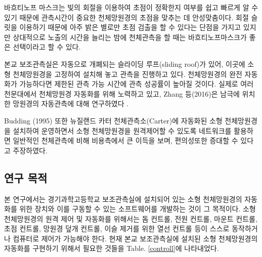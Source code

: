 바흐티노프 마스크는 빛의 회절을 이용하여 초점이 정확한지 여부를  쉽고 빠르게 알 수 있기 때문에 관측시간이 중요한 천체망원경의 초점을 맞추는 데 안성맞춤이다. 회절 슬릿을 이용하기 때문에 아주 밝은 별로만 초점 검출을 할 수 있다는 단점을 가지고 있지만 상대적으로 노출의 시간을 늘리는 밤에 천체관측을 할 때는 바흐티노프마스크가 좋은 선택이라고 할 수 있다.

본교 보조관측실은 자동으로 개폐되는 슬라이딩 루프(sliding roof)가 있어, 이곳에 소형 천체망원경을 고정하여 설치해 놓고 관측을 진행하고 있다. 천체망원경의 완전 자동화가 가능하다면 제한된 관측 가능 시간에 관측 성공률이 높아질 것이다. 실제로 여러 천문대에서 천체망원경 자동화를 위해 노력하고 있고, Zhang 등(2016)은 남극에 위치한 망원경의 자동관측에 대해 연구하였다 .\cite{Zhang2016}

Budding (1995) 또한 뉴질랜드 카터 천체관측소(Carter)에 자동화된 소형 천체망원경을 설치하여 운영하면서 소형 천체망원경을 원격제어할 수 있도록 네트워크를 활용하면 일반적인 천체관측에 비해 비용측에서 큰 이득을 보며, 편의성또한 증대할 수 있다고 주장하였다.\cite{budding1995global} 



\subsection{연구 목적}


본 연구에서는 경기과학고등학교 보조관측실에 설치되어 있는 소형 천체망원경의 자동화를 위한 장치와 이를 구동할 수 있는 소프트웨어를 개발하는 것이 그 목적이다. 소형 천체망원경의 원격 제어 및 자동화를 위해서는 돔 컨트롤, 전원 컨트롤, 마운트 컨트롤, 초점 컨트롤, 망원경 덮개 컨트롤, 이슬 제거를 위한 열선 컨트롤 등이 스스로 동작하거나 컴퓨터로 제어가 가능해야 한다. 현재 본교 보조관측실에 설치된 소형 천체망원경의 자동화를 구현하기 위해서 필요한 것들을 \textrm{Table}. \ref{controll}에 나타내었다.


